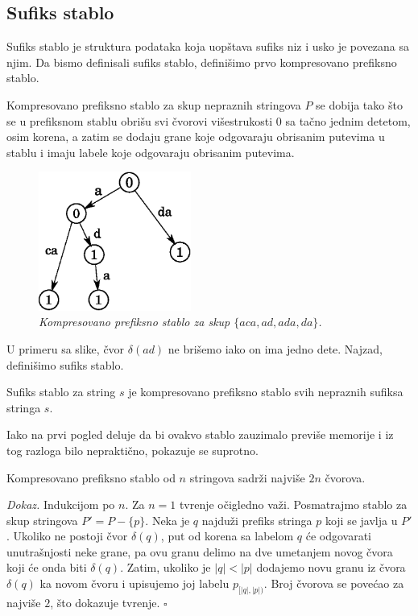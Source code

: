 \subsection{Sufiks stablo}

Sufiks stablo je struktura podataka koja uop\v stava sufiks niz i usko je povezana sa njim. Da bismo definisali sufiks stablo, defini\v simo prvo kompresovano prefiksno stablo.

\begin{dfn}
Kompresovano prefiksno stablo za skup nepraznih stringova $P$ se dobija tako \v sto se u prefiksnom stablu obri\v su svi \v cvorovi vi\v sestrukosti $0$ sa ta\v cno jednim detetom, osim korena, a zatim se dodaju grane koje odgovaraju obrisanim putevima u stablu i imaju labele koje odgovaraju obrisanim putevima.
\end{dfn}

\begin{figure}[H]
    \centering
    \includegraphics[width=50mm]{../img/ztrie1.eps}
    \caption*{\textit{Kompresovano prefiksno stablo za skup $\{aca,ad,ada,da\}$.}}
\end{figure}

U primeru sa slike, \v cvor $\delta(ad)$ ne bri\v semo iako on ima jedno dete. Najzad, defini\v simo sufiks stablo.

\begin{dfn}
Sufiks stablo za string $s$ je kompresovano prefiksno stablo svih nepraznih sufiksa stringa $s$.
\end{dfn}

Iako na prvi pogled deluje da bi ovakvo stablo zauzimalo previ\v se memorije i iz tog razloga bilo neprakti\v cno, pokazuje se suprotno.

\begin{thm}
Kompresovano prefiksno stablo od $n$ stringova sadr\v zi najvi\v se $2n$ \v cvorova. 
\end{thm}

\textit{Dokaz.} Indukcijom po $n$. Za $n=1$ tvr\dj enje o\v cigledno va\v zi. Posmatrajmo stablo za skup stringova $P' = P - \{p\}$. Neka je $q$ najdu\v zi prefiks stringa $p$ koji se javlja u $P'$. Ukoliko ne postoji \v cvor $\delta(q)$, put od korena sa labelom $q$ \' ce odgovarati unutra\v snjosti neke grane, pa ovu granu delimo na dve umetanjem novog \v cvora koji \' ce onda biti $\delta(q)$. Zatim, ukoliko je $|q| < |p|$ dodajemo novu granu iz \v cvora $\delta(q)$ ka novom \v cvoru i upisujemo joj labelu $p_{[|q|, |p|)}$. Broj \v cvorova se pove\' cao za najvi\v se $2$, \v sto dokazuje tvr\dj enje. \hfill $\square$


